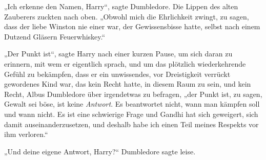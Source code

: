 „Ich erkenne den Namen, Harry“, sagte Dumbledore. Die Lippen des alten Zauberers zuckten nach oben.
„Obwohl mich die Ehrlichkeit zwingt, zu sagen, dass der liebe Winston nie einer war, der Gewissensbisse hatte, selbst nach einem Dutzend Gläsern Feuerwhiskey.“

„Der Punkt ist“, sagte Harry nach einer kurzen Pause, um sich daran zu erinnern, mit wem er eigentlich sprach, und um das plötzlich wiederkehrende Gefühl zu bekämpfen, dass er ein unwissendes, vor Dreistigkeit verrückt gewordenes Kind war, das kein Recht hatte, in diesem Raum zu sein, und kein Recht, Albus Dumbledore über irgendetwas zu befragen, „der Punkt ist, zu sagen, Gewalt sei böse, ist keine \emph{Antwort}. Es beantwortet nicht, wann man kämpfen soll und wann nicht. Es ist eine schwierige Frage und Gandhi hat sich geweigert, sich damit auseinanderzusetzen, und deshalb habe ich einen Teil meines Respekts vor ihm verloren.“

„Und deine eigene Antwort, Harry?“ Dumbledore sagte leise.


